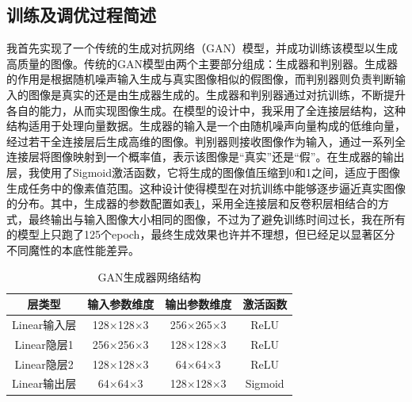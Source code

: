 \documentclass[UTF8]{ctexart}
\begin{document}
\subsection{训练及调优过程简述}
我首先实现了一个传统的生成对抗网络（GAN）模型，并成功训练该模型以生成高质量的图像。传统的GAN模型由两个主要部分组成：生成器和判别器。生成器的作用是根据随机噪声输入生成与真实图像相似的假图像，而判别器则负责判断输入的图像是真实的还是由生成器生成的。生成器和判别器通过对抗训练，不断提升各自的能力，从而实现图像生成。在模型的设计中，我采用了全连接层结构，这种结构适用于处理向量数据。生成器的输入是一个由随机噪声向量构成的低维向量，经过若干全连接层后生成高维的图像。判别器则接收图像作为输入，通过一系列全连接层将图像映射到一个概率值，表示该图像是“真实”还是“假”。在生成器的输出层，我使用了Sigmoid激活函数，它将生成的图像值压缩到0和1之间，适应于图像生成任务中的像素值范围。这种设计使得模型在对抗训练中能够逐步逼近真实图像的分布。其中，生成器的参数配置如表\ref{tab:gen_gan}，采用全连接层和反卷积层相结合的方式，最终输出与输入图像大小相同的图像，不过为了避免训练时间过长，我在所有的模型上只跑了125个epoch，最终生成效果也许并不理想，但已经足以显著区分不同魔性的本底性能差异。
\begin{table}[htbp]
\centering
\caption{GAN生成器网络结构}
\label{tab:gen_gan}
\begin{tabular}{cccc}
\toprule[1.5pt]
\textbf{层类型} & \textbf{输入参数维度} & \textbf{输出参数维度} & \textbf{激活函数} \\
\midrule[1.5pt]
Linear输入层 & 128$\times$128$\times$3 & 256$\times$265$\times$3 & ReLU \\
Linear隐层1 & 256$\times$256$\times$3 & 128$\times$128$\times$3 & ReLU \\
Linear隐层2 & 128$\times$128$\times$3 & 64$\times$64$\times$3 & ReLU \\
Linear输出层 & 64$\times$64$\times$3 & 128$\times$128$\times$3 & Sigmoid \\
\bottomrule[1.0pt]
\end{tabular}
\end{table}
\end{document}
